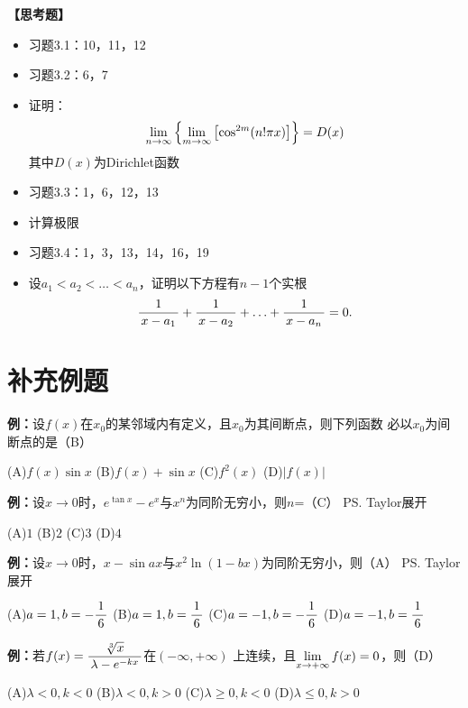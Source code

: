 {\bf 【思考题】}
\begin{itemize}
  \item 习题3.1：10，11，12
  \item 习题3.2：6，7
  \item 证明：$$\lim\limits_{n\to\infty}\left\{\lim\limits_{m\to\infty}\left[\cos^{2m}(n!\pi
	x)\right]\right\}=D(x)$$
	其中$D(x)$为Dirichlet函数
  \item 习题3.3：1，6，12，13
  \item  计算极限
  \item 习题3.4：1，3，13，14，16，19
  \item 设$a_1<a_2<\ldots<a_n$，证明以下方程有$n-1$个实根
	$$\displaystyle\frac{\,{1}\,}{\,{x-a_1}\,}+\displaystyle\frac{\,{1}\,}{\,{x-a_2}\,}+\ldots+\displaystyle\frac{\,{1}\,}{\,{x-a_n}\,}=0.$$
\end{itemize}

\newpage

\section*{补充例题}



{\bf 例：}设$f(x)$在$x_0$的某邻域内有定义，且$x_0$为其间断点，则下列函数
必以$x_0$为间断点的是（B）

\quad
(A)\;$f(x)\sin x$\hspace{2cm}
(B)\;$f(x)+\sin x$\hspace{2cm}
(C)\;$f^2(x)$\hspace{2cm}
(D)\;$|f(x)|$ 

{\bf 例：}设$x\to 0$时，$e^{\tan x}-e^x$与$x^n$为同阶无穷小，则$n$=（C）
\ps{Taylor展开}

\quad
(A)\;$1$\hspace{2cm}
(B)\;$2$\hspace{2cm}
(C)\;$3$\hspace{2cm}
(D)\;$4$ 

{\bf 例：}设$x\to 0$时，$x-\sin ax$与$x^2\ln(1-bx)$为同阶无穷小，则（A）
\ps{Taylor展开}

\quad
(A)\;$a=1,b=-\displaystyle\frac{\,{1}\,}{\,{6}\,}$\hspace{1em}
(B)\;$a=1,b=\displaystyle\frac{\,{1}\,}{\,{6}\,}$\hspace{1em}
(C)\;$a=-1,b=-\displaystyle\frac{\,{1}\,}{\,{6}\,}$\hspace{1em}
(D)\;$a=-1,b=\displaystyle\frac{\,{1}\,}{\,{6}\,}$

{\bf 例：}若$f(x)=\displaystyle\frac{\,{\sqrt[3]{x}}\,}{\,{\lambda-e^{-kx}}\,}$在$(-\infty,+\infty)$
上连续，且$\lim\limits_{x\to{+\infty}}f(x)=0$，则（D）

\quad
(A)\;$\lambda<0,k<0$\hspace{1cm}
(B)\;$\lambda<0,k>0$\hspace{1cm}
(C)\;$\lambda\geq0,k<0$\hspace{1cm}
(D)\;$\lambda\leq0,k>0$

